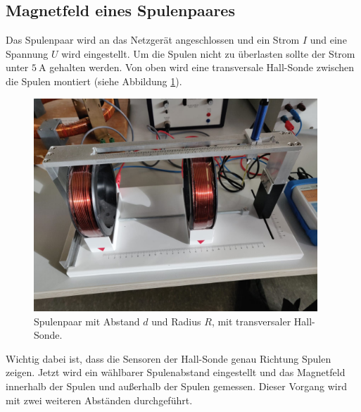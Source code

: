 \subsection{Magnetfeld eines Spulenpaares}
Das Spulenpaar wird an das Netzgerät angeschlossen und ein Strom $I$ und eine Spannung $U$ wird eingestellt.
Um die Spulen nicht zu überlasten sollte der Strom unter $\SI{5}{\ampere}$ gehalten werden.
Von oben wird eine transversale Hall-Sonde zwischen die Spulen montiert (siehe Abbildung \ref{fig:spulenpaar}).
\begin{figure}
    \centering
    \includegraphics[height=8cm]{content/spulenpaar.jpg}
    \caption{Spulenpaar mit Abstand $d$ und Radius $R$, mit transversaler Hall-Sonde.}
    \label{fig:spulenpaar}
\end{figure}
Wichtig dabei ist, dass die Sensoren der Hall-Sonde genau Richtung Spulen zeigen.
Jetzt wird ein wählbarer Spulenabstand eingestellt und das Magnetfeld innerhalb der Spulen und außerhalb der Spulen gemessen.
Dieser Vorgang wird mit zwei weiteren Abständen durchgeführt.

